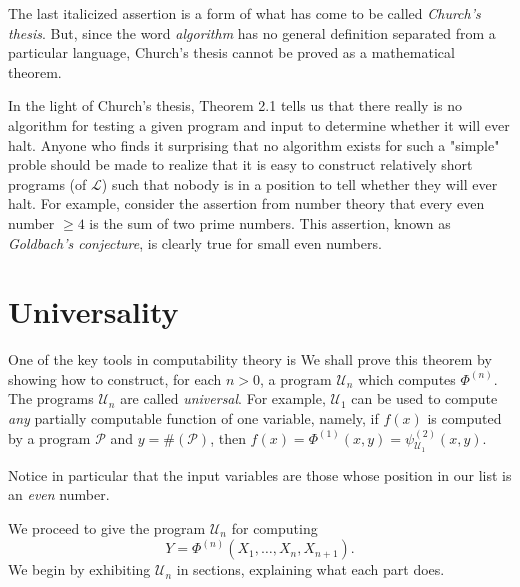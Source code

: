 \documentclass[12pt,a4paper,twoside,openany]{book}
\begin{document}
The last italicized assertion is a form of what has come to be called \textit{Church's thesis}. But, since the word \textit{algorithm} has no general definition separated from a particular language, Church's thesis cannot be proved as a mathematical theorem.

In the light of Church's thesis, Theorem 2.1 tells us that there really is no algorithm for testing a given program and input to determine whether it will ever halt. Anyone who finds it surprising that no algorithm exists for such a "simple" proble should be made to realize that it is easy to construct relatively short programs (of $\mathscr{L}$) such that nobody is in a position to tell whether they will ever halt. For example, consider the assertion from number theory that every even number $\ge 4$ is the sum of two prime numbers. This assertion, known as \textit{Goldbach's conjecture}, is clearly true for small even numbers.

\section{Universality}

One of the key tools in computability theory is
We shall prove this theorem by showing how to construct, for each $n>0$, a program $\mathscr{U}_n$ which computes $\Phi^{(n)}$. The programs $\mathscr{U}_n$ are called \textit{universal}. For example, $\mathscr{U}_1$ can be used to compute \textit{any} partially computable function of one variable, namely, if $f(x)$ is computed by a program $\mathscr{P}$ and $y=\#(\mathscr{P})$, then $f(x)=\Phi^{(1)}(x,y)=\psi_{\mathscr{U}_1}^{(2)}(x,y)$.

Notice in particular that the input variables are those whose position in our list is an \textit{even} number.

We proceed to give the program $\mathscr{U}_n$ for computing $$Y=\Phi^{(n)}(X_1,\ldots,X_n,X_{n+1}).$$ We begin by exhibiting $\mathscr{U}_n$ in sections, explaining what each part does.
\end{document}

